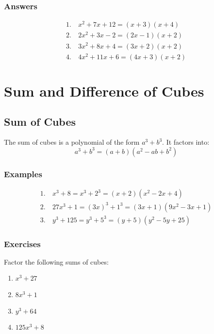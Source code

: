\documentclass[12pt]{article}
\begin{document}
\subsubsection*{Answers}
\begin{multicols}{2}
\begin{align*}
1.\ & x^2 + 7x + 12 = (x + 3)(x + 4) \\
2.\ & 2x^2 + 3x - 2 = (2x - 1)(x + 2) \\
3.\ & 3x^2 + 8x + 4 = (3x + 2)(x + 2) \\
4.\ & 4x^2 + 11x + 6 = (4x + 3)(x + 2)
\end{align*}
\end{multicols}

\newpage

\section*{Sum and Difference of Cubes}

\subsection*{Sum of Cubes}
The sum of cubes is a polynomial of the form $a^3 + b^3$. It factors into:
\[
a^3 + b^3 = (a + b)(a^2 - ab + b^2)
\]

\subsubsection*{ Examples}
\begin{align*}
1.\ & x^3 + 8 = x^3 + 2^3 = (x + 2)(x^2 - 2x + 4) \\
2.\ & 27x^3 + 1 = (3x)^3 + 1^3 = (3x + 1)(9x^2 - 3x + 1) \\
3.\ & y^3 + 125 = y^3 + 5^3 = (y + 5)(y^2 - 5y + 25)
\end{align*}

\subsubsection*{Exercises}
Factor the following sums of cubes:
\begin{multicols}{2}
\begin{enumerate}
    \item $x^3 + 27$
    \item $8x^3 + 1$
    \item $y^3 + 64$
    \item $125x^3 + 8$
\end{enumerate}
\end{multicols}
\end{document}
